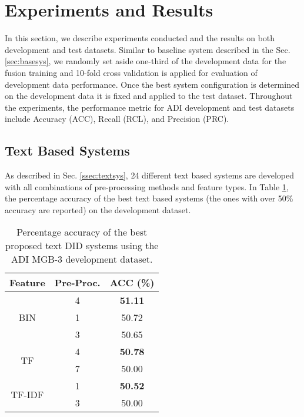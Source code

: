 \documentclass{article}
\begin{document}
\section{Experiments and Results}
\label{sec:exps&results}

In this section, we describe experiments conducted and the results on both development and test datasets. Similar to baseline system described in the Sec. \ref{sec:basesys}, we randomly set aside one-third of the development data for the fusion training and 10-fold cross validation is applied for evaluation of development data performance. Once the best system configuration is determined on the development data it is fixed and applied to the test dataset. Throughout the experiments, the performance metric for ADI development and test datasets include Accuracy (ACC), Recall (RCL), and Precision (PRC).

\subsection{Text Based Systems}
\label{ssec:txsysperf}

As described in Sec. \ref{ssec:textsys}, 24 different text based systems are developed with all combinations of pre-processing methods and feature types. In Table \ref{tab:textsys}, the percentage accuracy of the best text based systems (the ones with over 50\% accuracy are reported) on the development dataset.

\begin{table}[h]\caption{Percentage accuracy of the best proposed text DID systems using the ADI MGB-3 development dataset.}\label{tab:textsys}
\vspace{5pt}
\centering
\begin{tabular}{|c|c|c|}
\hline
\textbf{Feature} & \textbf{Pre-Proc.} & \textbf{ACC (\%)} \\ \hline \hline
\multirow{3}{*}{BIN} & 4 & \textbf{51.11} \\ \cline{2-3}
& 1    & 50.72 \\ \cline{2-3}
& 3    & 50.65 \\ \hline
\multirow{2}{*}{TF} & 4 & \textbf{50.78} \\ \cline{2-3}
& 7    & 50.00 \\ \hline
\multirow{2}{*}{TF-IDF} & 1 & \textbf{50.52} \\ \cline{2-3}
& 3    & 50.00 \\ \hline
\end{tabular}
\end{table}
\end{document}
